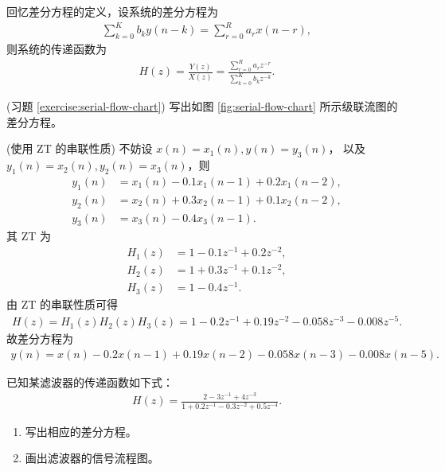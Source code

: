 \begin{property}[传递函数和差分方程之间的关系]
    回忆差分方程的定义，设系统的差分方程为
    \begin{align*}
        \sum_{k = 0}^{K}b_ky(n-k) = \sum_{r = 0}^{R}a_rx(n-r),
    \end{align*}
    则系统的传递函数为
    \begin{align*}
        H(z) = \frac{Y(z)}{X(z)} = \frac{\sum_{r = 0}^{R}a_rz^{-r}}{\sum_{k = 0}^{K}b_kz^{-k}}.
    \end{align*}
\end{property}

\begin{exercise}
    (习题 \ref{exercise:serial-flow-chart})
    写出如图 \ref{fig:serial-flow-chart} 所示级联流图的差分方程。
\end{exercise}

\begin{solution}
    (使用 ZT 的串联性质)
    不妨设 $x(n) = x_1(n), y(n) = y_3(n)$，
    以及 $y_1(n) = x_2(n), y_2(n) = x_3(n)$，则
    \begin{align*}
        y_1(n) & = x_1(n) - 0.1x_1(n - 1) + 0.2x_1(n - 2), \\
        y_2(n) & = x_2(n) + 0.3x_2(n - 1) + 0.1x_2(n - 2), \\
        y_3(n) & = x_3(n) - 0.4x_3(n - 1).
    \end{align*}
    其 ZT 为
    \begin{align*}
        H_1(z) & = 1 - 0.1z^{-1} + 0.2z^{-2}, \\
        H_2(z) & = 1 + 0.3z^{-1} + 0.1z^{-2}, \\
        H_3(z) & = 1 - 0.4z^{-1}.
    \end{align*}
    由 ZT 的串联性质可得
    \begin{align*}
        H(z) = H_1(z)H_2(z)H_3(z) = 1 - 0.2z^{-1} + 0.19z^{-2} - 0.058z^{-3} - 0.008z^{-5}.
    \end{align*}
    故差分方程为
    \begin{align*}
        y(n) = x(n) - 0.2x(n - 1) + 0.19x(n - 2) - 0.058x(n - 3) - 0.008x(n - 5).
    \end{align*}
\end{solution}

\begin{exercise}
    已知某滤波器的传递函数如下式：
    \begin{align*}
        H(z) = \frac{2 - 3z^{-1} + 4z^{-3}}{1 + 0.2z^{-1} - 0.3z^{-2} + 0.5z^{-4}}.
    \end{align*}
    \begin{enumerate}[label=(\arabic*)]
        \item 写出相应的差分方程。
        \item 画出滤波器的信号流程图。
    \end{enumerate}
\end{exercise}

